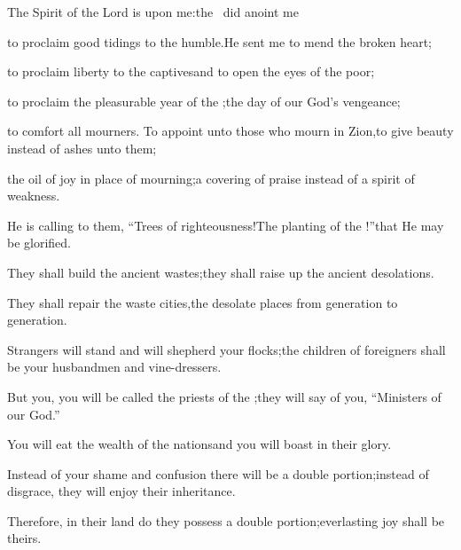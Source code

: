 
\begin{inparaenum}
  \pa{} The Spirit of the Lord \lord{} is upon me:\pa{}the \lord\ did anoint me%

  \pb{}to proclaim good tidings to the humble.\pa{}He sent me to mend the broken heart;%

  \pb{}to proclaim liberty to the captives\pa{}and to open the eyes of the poor;%

  \pb{} to proclaim the pleasurable year of the \lord;\pa{}the day of our God's vengeance;%

  \pb{}to comfort all mourners.  To appoint unto those who mourn in Zion,\pa{}to give beauty instead of ashes unto them;%

  \pb{}the oil of joy in place of mourning;\pa{}a covering of praise instead of a spirit of weakness.%

  \pb{}He is calling to them, ``Trees of righteousness!\pa{}The planting of the \lord!''\pa{}that He may be glorified.%

  \pc{} They shall build the ancient wastes;\pa{}they shall raise up the ancient desolations.%

  \pc{}They shall repair the waste cities,\pa{}the desolate places from generation to generation.%

  \pb{} Strangers will stand and will shepherd your flocks;\pa{}the children of foreigners shall be your husbandmen and vine-dressers.%

  \pb{} But you, you will be called the priests of the \lord;\pa{}they will say of you, ``Ministers of our God.''%

  \pc{}You will eat the wealth of the nations\pa{}and you will boast in their glory.%

  \pc{} Instead of your shame and confusion there will be a double portion;\pa{}instead of disgrace, they will enjoy their inheritance.%

  \pc{}Therefore, in their land do they possess a double portion;\pa{}everlasting joy shall be theirs.%


\end{inparaenum}
